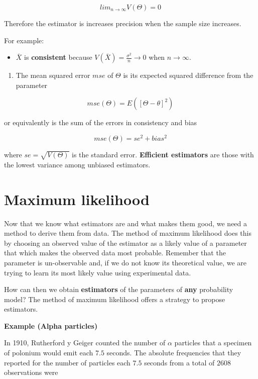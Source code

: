 \documentclass[
]{book}
\providecommand{\tightlist}{%
  \setlength{\itemsep}{0pt}\setlength{\parskip}{0pt}}
\begin{document}
\[lim_{n\rightarrow \infty} V(\Theta) = 0\]

Therefore the estimator is increases precision when the sample size increases.

For example:

\begin{itemize}
\tightlist
\item
  \(\bar{X}\) is \textbf{consistent} because \(V(\bar{X})=\frac{\sigma^2}{n}\rightarrow 0\) when \(n \rightarrow \infty\).
\end{itemize}

\begin{enumerate}
\def\labelenumi{\arabic{enumi}.}
\setcounter{enumi}{2}
\tightlist
\item
  The mean squared error \(mse\) of \(\Theta\) is its expected squared difference from the parameter
\end{enumerate}

\[mse(\Theta)=E([\Theta - \theta]^2)\]

or equivalently is the sum of the errors in consistency and bias

\[mse(\Theta)=se^2 + bias^2\]

where \(se=\sqrt{V(\Theta)}\) is the standard error.
\textbf{Efficient estimators} are those with the lowest variance among unbiased estimators.

\hypertarget{maximum-likelihood-1}{%
\section{Maximum likelihood}\label{maximum-likelihood-1}}

Now that we know what estimators are and what makes them good, we need a method to derive them from data. The method of maximum likelihood does this by choosing an observed value of the estimator as a likely value of a parameter that which makes the observed data most probable. Remember that the parameter is un-observable and, if we do not know its theoretical value, we are trying to learn its most likely value using experimental data.

How can then we obtain \textbf{estimators} of the parameters of \textbf{any} probability model? The method of maximum likelihood offers a strategy to propose estimators.

\textbf{Example (Alpha particles)}

In 1910, Rutherford y Geiger counted the number of \(\alpha\) particles that a specimen of polonium would emit each \(7.5\) seconds. The absolute frequencies that they reported for the number of particles each \(7.5\) seconds from a total of \(2608\) observations were
\end{document}
